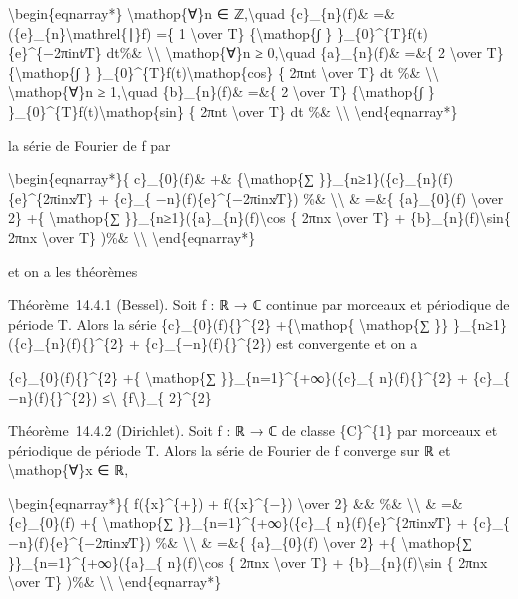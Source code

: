 \documentclass[]{article}
\begin{document}
\textbackslash{}begin\{eqnarray*\} \textbackslash{}mathop\{∀\}n ∈
ℤ,\textbackslash{}quad \{c\}\_\{n\}(f)\& =\&
(\{e\}\_\{n\}\textbackslash{}mathrel\{∣\}f) =\{ 1 \textbackslash{}over
T\} \{\textbackslash{}mathop\{∫ \}
\}\_\{0\}\^{}\{T\}f(t)\{e\}\^{}\{−2πint∕T\} dt\%\&
\textbackslash{}\textbackslash{} \textbackslash{}mathop\{∀\}n ≥
0,\textbackslash{}quad \{a\}\_\{n\}(f)\& =\&\{ 2 \textbackslash{}over
T\} \{\textbackslash{}mathop\{∫ \}
\}\_\{0\}\^{}\{T\}f(t)\textbackslash{}mathop\{cos\} \{ 2πnt
\textbackslash{}over T\} dt \%\& \textbackslash{}\textbackslash{}
\textbackslash{}mathop\{∀\}n ≥ 1,\textbackslash{}quad \{b\}\_\{n\}(f)\&
=\&\{ 2 \textbackslash{}over T\} \{\textbackslash{}mathop\{∫ \}
\}\_\{0\}\^{}\{T\}f(t)\textbackslash{}mathop\{sin\} \{ 2πnt
\textbackslash{}over T\} dt \%\& \textbackslash{}\textbackslash{}
\textbackslash{}end\{eqnarray*\}

la série de Fourier de f par

\textbackslash{}begin\{eqnarray*\}\{ c\}\_\{0\}(f)\& +\&
\{\textbackslash{}mathop\{∑
\}\}\_\{n≥1\}(\{c\}\_\{n\}(f)\{e\}\^{}\{2πinx∕T\} + \{c\}\_\{
−n\}(f)\{e\}\^{}\{−2πinx∕T\}) \%\& \textbackslash{}\textbackslash{} \&
=\&\{ \{a\}\_\{0\}(f) \textbackslash{}over 2\} +\{
\textbackslash{}mathop\{∑
\}\}\_\{n≥1\}(\{a\}\_\{n\}(f)\textbackslash{}cos \{ 2πnx
\textbackslash{}over T\} + \{b\}\_\{n\}(f)\textbackslash{}sin\{ 2πnx
\textbackslash{}over T\} )\%\& \textbackslash{}\textbackslash{}
\textbackslash{}end\{eqnarray*\}

et on a les théorèmes

Théorème~14.4.1 (Bessel). Soit f : ℝ → ℂ continue par morceaux et
périodique de période T. Alors la série
\textbar{}\{c\}\_\{0\}(f)\{\textbar{}\}\^{}\{2\}
+\{\textbackslash{}mathop\{ \textbackslash{}mathop\{∑ \}\}
\}\_\{n≥1\}(\textbar{}\{c\}\_\{n\}(f)\{\textbar{}\}\^{}\{2\} +
\textbar{}\{c\}\_\{−n\}(f)\{\textbar{}\}\^{}\{2\}) est convergente et on
a

\textbar{}\{c\}\_\{0\}(f)\{\textbar{}\}\^{}\{2\} +\{
\textbackslash{}mathop\{∑ \}\}\_\{n=1\}\^{}\{+∞\}(\textbar{}\{c\}\_\{
n\}(f)\{\textbar{}\}\^{}\{2\} + \textbar{}\{c\}\_\{
−n\}(f)\{\textbar{}\}\^{}\{2\}) ≤\textbackslash{}\textbar{}
\{f\textbackslash{}\textbar{}\}\_\{ 2\}\^{}\{2\}

Théorème~14.4.2 (Dirichlet). Soit f : ℝ → ℂ de classe \{C\}\^{}\{1\} par
morceaux et périodique de période T. Alors la série de Fourier de f
converge sur ℝ et \textbackslash{}mathop\{∀\}x ∈ ℝ,

\textbackslash{}begin\{eqnarray*\}\{ f(\{x\}\^{}\{+\}) +
f(\{x\}\^{}\{−\}) \textbackslash{}over 2\} \&\& \%\&
\textbackslash{}\textbackslash{} \& =\& \{c\}\_\{0\}(f) +\{
\textbackslash{}mathop\{∑ \}\}\_\{n=1\}\^{}\{+∞\}(\{c\}\_\{
n\}(f)\{e\}\^{}\{2πinx∕T\} + \{c\}\_\{ −n\}(f)\{e\}\^{}\{−2πinx∕T\})
\%\& \textbackslash{}\textbackslash{} \& =\&\{ \{a\}\_\{0\}(f)
\textbackslash{}over 2\} +\{ \textbackslash{}mathop\{∑
\}\}\_\{n=1\}\^{}\{+∞\}(\{a\}\_\{ n\}(f)\textbackslash{}cos \{ 2πnx
\textbackslash{}over T\} + \{b\}\_\{n\}(f)\textbackslash{}sin \{ 2πnx
\textbackslash{}over T\} )\%\& \textbackslash{}\textbackslash{}
\textbackslash{}end\{eqnarray*\}
\end{document}
